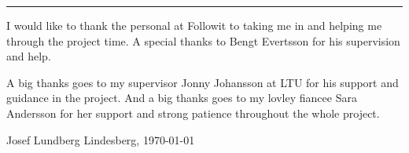 \vspace{-10ex}%
\rule{\textwidth}{0.3pt}
\vspace{5ex}


I would like to thank the personal at Followit to taking me in and helping me through the project time. A special thanks to Bengt Evertsson for his supervision and help. 

A big thanks goes to my supervisor Jonny Johansson at LTU for his support and guidance in the project.
And a big thanks goes to my lovley fiancee Sara Andersson for her support and strong patience throughout the whole project. 

\begin{flushright}
Josef Lundberg
\newline
Lindesberg, \today
\end{flushright}

\begin{comment}
- Rätta till bilden med VHF skalan
- Räkna och visa den koplexa polerna mm för chebychev


\end{comment}

